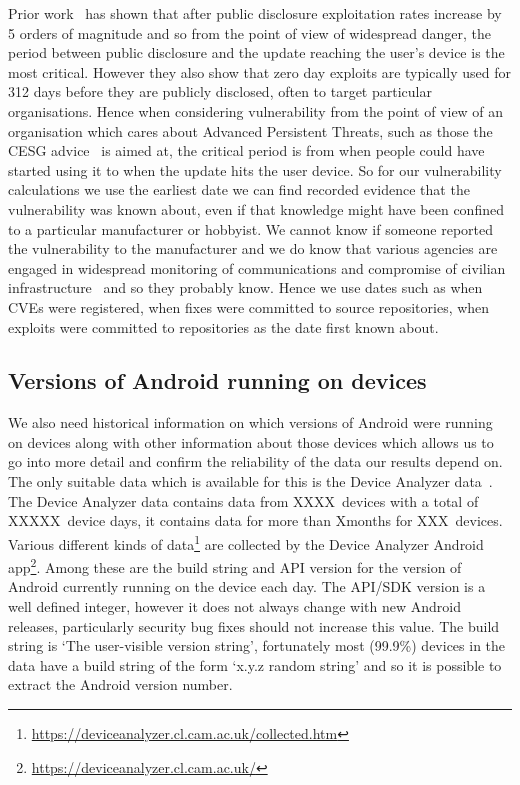\documentclass[conference,a4paper,twoside]{IEEEtran}
\newcommand{\daNumDevices}{XXXX}
\newcommand{\daDeviceDays}{XXXXX}
\newcommand{\daMonths}{X}%
\newcommand{\daMonthsDevices}{XXX}
\begin{document}
Prior work~\cite{Bilge2012} has shown that after public disclosure exploitation rates increase by 5 orders of magnitude and so from the point of view of widespread danger, the period between public disclosure and the update reaching the user's device is the most critical.
However they also show that zero day exploits are typically used for 312 days before they are publicly disclosed, often to target particular organisations.
Hence when considering vulnerability from the point of view of an organisation which cares about Advanced Persistent Threats, such as those the CESG advice~\cite{CESG2013} is aimed at, the critical period is from when people could have started using it to when the update hits the user device.
So for our vulnerability calculations we use the earliest date we can find recorded evidence that the vulnerability was known about, even if that knowledge might have been confined to a particular manufacturer or hobbyist.
We cannot know if someone reported the vulnerability to the manufacturer and we do know that various agencies are engaged in widespread monitoring of communications and compromise of civilian infrastructure~\cite{TODO} and so they probably know.
Hence we use dates such as when CVEs were registered, when fixes were committed to source repositories, when exploits were committed to repositories as the date first known about.

\daTabAndVulns

\subsection{Versions of Android running on devices}
We also need historical information on which versions of Android were running on devices along with other information about those devices which allows us to go into more detail and confirm the reliability of the data our results depend on.
The only suitable data which is available for this is the Device Analyzer data~\cite{Wagner2013}.
The Device Analyzer data contains data from \daNumDevices\ devices with a total of \daDeviceDays\ device days, it contains data for more than \daMonths months for \daMonthsDevices\ devices.
Various different kinds of data\footnote{\url{https://deviceanalyzer.cl.cam.ac.uk/collected.htm}} are collected by the Device Analyzer Android app\footnote{\url{https://deviceanalyzer.cl.cam.ac.uk/}}.
Among these are the build string and API version for the version of Android currently running on the device each day.
The API/SDK version is a well defined integer, however it does not always change with new Android releases, particularly security bug fixes should not increase this value.
The build string is `The user-visible version string', fortunately most (99.9\%) devices in the data have a build string of the form `x.y.z random string' and so it is possible to extract the Android version number.
\end{document}
